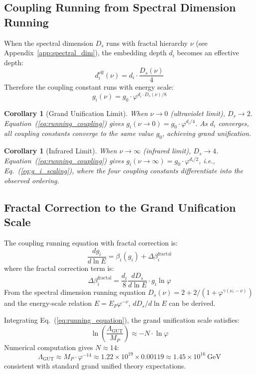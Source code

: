 \documentclass[12pt,a4paper,twocolumn]{article}
\renewcommand{\phi}{\varphi}
\newtheorem{corollary}[theorem]{Corollary}
\begin{document}
\subsection{Coupling Running from Spectral Dimension Running}
When the spectral dimension $D_s$ runs with fractal hierarchy $\nu$ (see Appendix~\ref{app:spectral_dim}), the embedding depth $d_i$ becomes an effective depth:
\begin{equation}
d_i^{\text{eff}}(\nu) = d_i \cdot \frac{D_s(\nu)}{4}
\label{eq:effective_depth}
\end{equation}
Therefore the coupling constant runs with energy scale:
\begin{equation}
g_i(\nu) = g_0 \cdot \phi^{d_i \cdot D_s(\nu)/8}
\label{eq:running_coupling}
\end{equation}

\begin{corollary}[Grand Unification Limit]
When $\nu \to 0$ (ultraviolet limit), $D_s \to 2$. Equation~(\ref{eq:running_coupling}) gives $g_i(\nu\to 0) = g_0 \cdot \phi^{d_i/4}$. As $d_i$ converges, all coupling constants converge to the same value $g_0$, achieving grand unification.
\end{corollary}

\begin{corollary}[Infrared Limit]
When $\nu \to \infty$ (infrared limit), $D_s \to 4$. Equation~(\ref{eq:running_coupling}) gives $g_i(\nu\to\infty) = g_0 \cdot \phi^{d_i/2}$, i.e., Eq.~(\ref{eq:g_i_scaling}), where the four coupling constants differentiate into the observed ordering.
\end{corollary}

\subsection{Fractal Correction to the Grand Unification Scale}
The coupling running equation with fractal correction is:
\begin{equation}
\frac{dg_i}{d\ln E} = \beta_i(g_i) + \Delta\beta_i^{\text{fractal}}
\label{eq:running_equation}
\end{equation}
where the fractal correction term is:
\[
\Delta\beta_i^{\text{fractal}} = \frac{d_i}{8}\frac{dD_s}{d\ln E} \cdot g_i \ln\phi
\]
From the spectral dimension running equation $D_s(\nu) = 2 + 2/(1+\phi^{\gamma(\nu_*-\nu)})$ and the energy-scale relation $E = E_P \phi^{-\nu}$, $dD_s/d\ln E$ can be derived.

Integrating Eq.~(\ref{eq:running_equation}), the grand unification scale satisfies:
\[
\ln\left(\frac{\Lambda_{\text{GUT}}}{M_P}\right) \approx -N \cdot \ln\phi
\]
Numerical computation gives $N \approx 14$:
\[
\Lambda_{\text{GUT}} \approx M_P \cdot \phi^{-14} \approx 1.22\times 10^{19} \times 0.00119 \approx 1.45\times 10^{16}\ \text{GeV}
\]
consistent with standard grand unified theory expectations.
\end{document}
